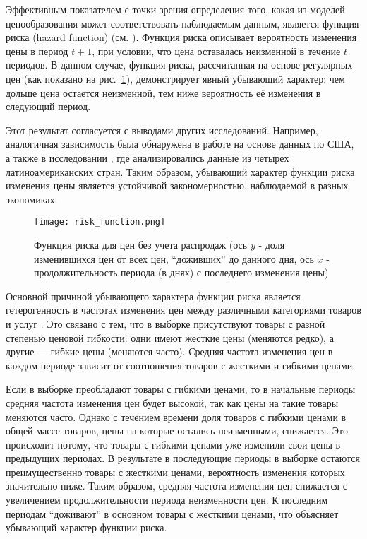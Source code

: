 

Эффективным показателем с точки зрения определения того, какая из моделей ценообразования может соответствовать наблюдаемым данным, является функция риска (hazard function) (см. \cite{nakamura2013price}). Функция риска описывает вероятность изменения цены в период \( t+1 \), при условии, что цена оставалась неизменной в течение \( t \) периодов. В данном случае, функция риска, рассчитанная на основе регулярных цен (как показано на рис.~\ref{fig:risk_function}), демонстрирует явный убывающий характер: чем дольше цена остается неизменной, тем ниже вероятность её изменения в следующий период.

Этот результат согласуется с выводами других исследований. Например, аналогичная зависимость была обнаружена в работе \cite{Nakamura2008} на основе данных по США, а также в исследовании \cite{cavallo2018scraped}, где анализировались данные из четырех латиноамериканских стран. Таким образом, убывающий характер функции риска изменения цены является устойчивой закономерностью, наблюдаемой в разных экономиках.

\begin{figure}[h!]
	\centering
	\texttt{[image: risk\_function.png]} %
	\caption{Функция риска для цен без учета распродаж (ось \( y \) - доля изменившихся цен от всех цен, ``доживших'' до данного дня, ось \( x \) - продолжительность периода (в днях) с последнего изменения цены)}
	\label{fig:risk_function}
\end{figure}

Основной причиной убывающего характера функции риска является гетерогенность в частотах изменения цен между различными категориями товаров и услуг \cite{Nakamura2008}. Это связано с тем, что в выборке присутствуют товары с разной степенью ценовой гибкости: одни имеют жесткие цены (меняются редко), а другие --- гибкие цены (меняются часто). Средняя частота изменения цен в каждом периоде зависит от соотношения товаров с жесткими и гибкими ценами.

Если в выборке преобладают товары с гибкими ценами, то в начальные периоды средняя частота изменения цен будет высокой, так как цены на такие товары меняются часто. Однако с течением времени доля товаров с гибкими ценами в общей массе товаров, цены на которые остались неизменными, снижается. Это происходит потому, что товары с гибкими ценами уже изменили свои цены в предыдущих периодах. В результате в последующие периоды в выборке остаются преимущественно товары с жесткими ценами, вероятность изменения которых значительно ниже. Таким образом, средняя частота изменения цен снижается с увеличением продолжительности периода неизменности цен. К последним периодам ``доживают'' в основном товары с жесткими ценами, что объясняет убывающий характер функции риска.


